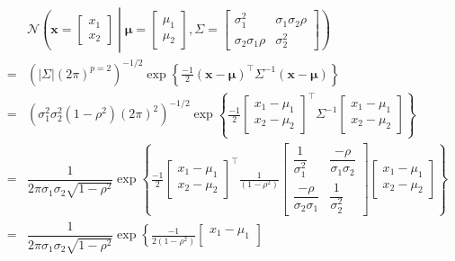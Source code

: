 \documentclass[
]{book}
\theoremstyle{definition}
\theoremstyle{definition}
\theoremstyle{definition}
\theoremstyle{definition}
\theoremstyle{remark}
\begin{document}
\[
\begin{aligned}
 & \mathcal{N}\left(\boldsymbol{x}=\begin{bmatrix}x_{1}\\
x_{2}
\end{bmatrix} \middle| \boldsymbol{\mu}=\begin{bmatrix}\mu_{1}\\
\mu_{2}
\end{bmatrix},\mathit{\Sigma}=\begin{bmatrix}\sigma_{1}^{2} & \sigma_{1}\sigma_{2}\rho\\
\sigma_{2}\sigma_{1}\rho & \sigma_{2}^{2}
\end{bmatrix}\right)\\
= & \left(\left|\mathit{\Sigma}\right|\left(2\pi\right)^{p=2}\right)^{-1/2}\exp\left\{ \frac{-1}{2}\left(\boldsymbol{x}-\boldsymbol{\mu}\right)^{\intercal}\mathit{\Sigma}^{-1}\left(\boldsymbol{x}-\boldsymbol{\mu}\right)\right\} \\
= & \left(\sigma_{1}^{2}\sigma_{2}^{2}\left(1-\rho^{2}\right)\left(2\pi\right)^{2}\right)^{-1/2}\exp\left\{ \frac{-1}{2}\begin{bmatrix}x_{1}-\mu_{1}\\
x_{2}-\mu_{2}
\end{bmatrix}^{\intercal}\mathit{\Sigma}^{-1}\begin{bmatrix}x_{1}-\mu_{1}\\
x_{2}-\mu_{2}
\end{bmatrix}\right\} \\
= & \dfrac{1}{2\pi\sigma_{1}\sigma_{2}\sqrt{1-\rho^{2}}}\exp\left\{ \frac{-1}{2}\begin{bmatrix}x_{1}-\mu_{1}\\
x_{2}-\mu_{2}
\end{bmatrix}^{\intercal}\frac{1}{\left(1-\rho^{2}\right)}\left[\begin{array}{cc}
\dfrac{1}{\sigma_{1}^{2}} & \dfrac{-\rho}{\sigma_{1}\sigma_{2}}\\
\dfrac{-\rho}{\sigma_{2}\sigma_{1}} & \dfrac{1}{\sigma_{2}^{2}}
\end{array}\right]\begin{bmatrix}x_{1}-\mu_{1}\\
x_{2}-\mu_{2}
\end{bmatrix}\right\} \\
= & \dfrac{1}{2\pi\sigma_{1}\sigma_{2}\sqrt{1-\rho^{2}}}\exp\left\{ \frac{-1}{2\left(1-\rho^{2}\right)}\begin{bmatrix}x_{1}-\mu_{1}\\

\end{bmatrix}
\end{aligned}\]
\end{document}
